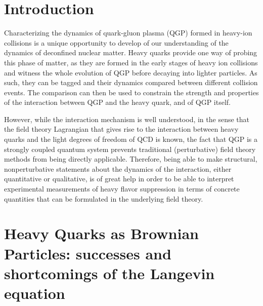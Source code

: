 \documentclass[final,3p,times]{elsarticle}
\begin{document}




\section{Introduction}
\label{sec:intro}

Characterizing the dynamics of quark-gluon plasma (QGP) formed in heavy-ion collisions is a unique opportunity to develop of our understanding of the dynamics of deconfined nuclear matter. Heavy quarks provide one way of probing this phase of matter, as they are formed in the early stages of heavy ion collisions and witness the whole evolution of QGP before decaying into lighter particles. As such, they can be tagged and their dynamics compared between different collision events. The comparison can then be used to constrain the strength and properties of the interaction between QGP and the heavy quark, and of QGP itself.%

However, while the interaction mechanism is well understood, in the sense that the field theory Lagrangian that gives rise to the interaction between heavy quarks and the light degrees of freedom of QCD is known, the fact that QGP is a strongly coupled quantum system prevents traditional (perturbative) field theory methods from being directly applicable. Therefore, being able to make structural, nonperturbative statements about the dynamics of the interaction, either quantitative or qualitative, is of great help in order to be able to interpret experimental measurements of heavy flavor suppression in terms of concrete quantities that can be formulated in the underlying field theory.



\section{Heavy Quarks as Brownian Particles: successes and shortcomings of the Langevin equation}
\end{document}
